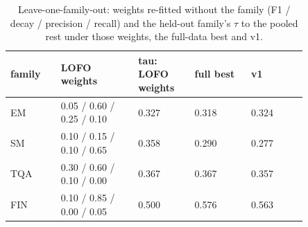 \begin{table}[htbp]
\centering\scriptsize
\caption{Leave-one-family-out: weights re-fitted without the family (F1 / decay / precision / recall) and the held-out family's $\tau$ to the pooled rest under those weights, the full-data best and v1.}
\label{tab:lofo_short}
\setlength{\tabcolsep}{3pt}
\begin{tabular}{lp{0.269\linewidth}p{0.194\linewidth}p{0.194\linewidth}p{0.194\linewidth}}
\toprule
family & LOFO weights & tau: LOFO weights & full best & v1 \\
\midrule
EM & 0.05 / 0.60 / 0.25 / 0.10 & 0.327 & 0.318 & 0.324 \\
SM & 0.10 / 0.15 / 0.10 / 0.65 & 0.358 & 0.290 & 0.277 \\
TQA & 0.30 / 0.60 / 0.10 / 0.00 & 0.367 & 0.367 & 0.357 \\
FIN & 0.10 / 0.85 / 0.00 / 0.05 & 0.500 & 0.576 & 0.563 \\
\bottomrule
\end{tabular}
\end{table}
